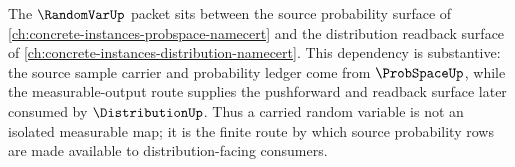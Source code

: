 The $\RandomVarUp$ packet sits between the source probability surface of \autoref{ch:concrete-instances-probspace-namecert} and the distribution readback surface of \autoref{ch:concrete-instances-distribution-namecert}. This dependency is substantive: the source sample carrier and probability ledger come from $\ProbSpaceUp$, while the measurable-output route supplies the pushforward and readback surface later consumed by $\DistributionUp$. Thus a carried random variable is not an isolated measurable map; it is the finite route by which source probability rows are made available to distribution-facing consumers.
